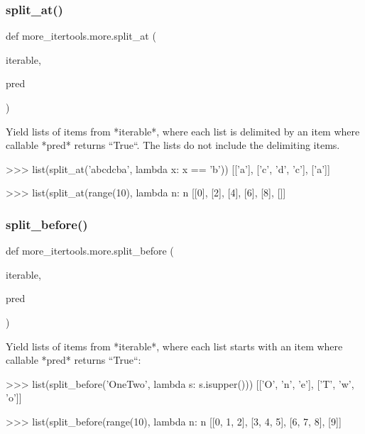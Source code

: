 \subsubsection{\texorpdfstring{split\+\_\+at()}{split\_at()}}
{\footnotesize\ttfamily def more\+\_\+itertools.\+more.\+split\+\_\+at (\begin{DoxyParamCaption}\item[{}]{iterable,  }\item[{}]{pred }\end{DoxyParamCaption})}

\begin{DoxyVerb}Yield lists of items from *iterable*, where each list is delimited by
an item where callable *pred* returns ``True``. The lists do not include
the delimiting items.

    >>> list(split_at('abcdcba', lambda x: x == 'b'))
    [['a'], ['c', 'd', 'c'], ['a']]

    >>> list(split_at(range(10), lambda n: n %
    [[0], [2], [4], [6], [8], []]
\end{DoxyVerb}
 \mbox{\label{namespacemore__itertools_1_1more_a773eb80f47263555be2b28b15ec33751}} 
\subsubsection{\texorpdfstring{split\+\_\+before()}{split\_before()}}
{\footnotesize\ttfamily def more\+\_\+itertools.\+more.\+split\+\_\+before (\begin{DoxyParamCaption}\item[{}]{iterable,  }\item[{}]{pred }\end{DoxyParamCaption})}

\begin{DoxyVerb}Yield lists of items from *iterable*, where each list starts with an
item where callable *pred* returns ``True``:

    >>> list(split_before('OneTwo', lambda s: s.isupper()))
    [['O', 'n', 'e'], ['T', 'w', 'o']]

    >>> list(split_before(range(10), lambda n: n %
    [[0, 1, 2], [3, 4, 5], [6, 7, 8], [9]]\end{DoxyVerb}
 \mbox{\label{namespacemore__itertools_1_1more_a71a959b7e87fad38c9fb6afe150d89fa}} 
